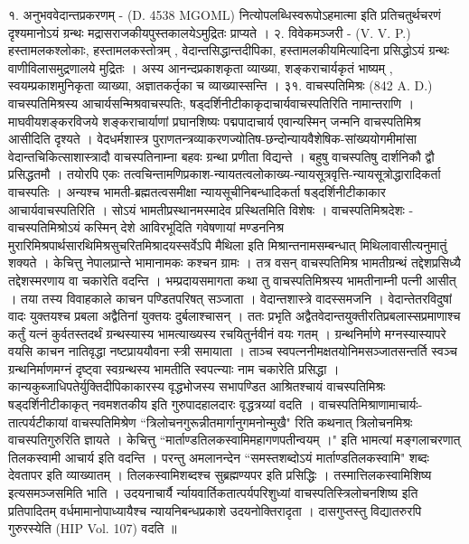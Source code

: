 १. अनुभववेदान्तप्रकरणम् - (D. 4538 MGOML)
नित्योपलब्धिस्वरूपोऽहमात्मा इति प्रतिचतुर्थचरणं दृश्यमानोऽयं ग्रन्थः मद्रासराजकीयपुस्तकालयेऽमुद्रितः प्राप्यते ।
२. विवेकमञ्जरी - (V. V. P.)
हस्तामलकश्लोकाः, हस्तामलकस्तोत्रम् , वेदान्तसिद्धान्तदीपिका, हस्तामलकीयमित्यादिना प्रसिद्धोऽयं ग्रन्थः वाणीविलासमुद्रणालये मुद्रितः । अस्य आनन्दप्रकाशकृता व्याख्या, शङ्कराचार्यकृतं भाष्यम् , स्वयम्प्रकाशमुनिकृता व्याख्या, अज्ञातकर्तृका च व्याख्यास्सन्ति ।
३१. वाचस्पतिमिश्रः (842 A. D.)
वाचस्पतिमिश्रस्य आचार्यसन्मिश्रवाचस्पतिः, षड्दर्शिनीटीकाकृदाचार्यवाचस्पतिरिति नामान्तराणि । माघवीयशङ्करविजये शङ्कराचार्याणां प्रघानशिष्यः पद्मपादाचार्य एवान्यस्मिन् जन्मनि वाचस्पतिमिश्र आसीदिति दृश्यते । वेदधर्मशास्त्र पुराणतन्त्रव्याकरणज्योतिष-छन्दोन्यायवैशेषिक-सांख्ययोगमीमांसा वेदान्तचिकित्साशास्त्रादौ वाचस्पतिनाम्ना बहवः ग्रन्था प्रणीता विद्यन्ते । बहुषु वाचस्पतिषु दार्शनिकौ द्वौ प्रसिद्धतमौ । तयोरपि एकः तत्वचिन्तामणिप्रकाश-न्यायतत्वलोकाख्य-न्यायसूत्रवृत्ति-न्यायसूत्रोद्धारादिकर्ता वाचस्पतिः । अन्यश्च भामती-ब्रह्मतत्वसमीक्षा न्यायसूचीनिबन्धादिकर्ता षड्दर्शिनीटीकाकार आचार्यवाचस्पतिरिति । सोऽयं भामतीप्रस्थानमस्मादेव प्रस्थितमिति विशेषः ।
वाचस्पतिमिश्रदेशः -
वाचस्पतिमिश्रोऽयं कस्मिन् देशे आविरभूदिति गवेषणायां मण्डननिश्र मुरारिमिश्रपार्थसारथिमिश्रसुचरितमिश्रादयस्सर्वेऽपि मैथिला इति मिश्रान्तनामसम्बन्धात् मिथिलावासीत्यनुमातुं शक्यते । केचित्तु नेपालप्रान्ते भामानामकः कश्चन ग्रामः । तत्र वसन् वाचस्पतिमिश्र भामतीग्रन्थं तद्देशप्रसिध्यै तद्देशस्मरणाय वा चकारेति वदन्ति ।
भम्प्रदायसमागता कथा तु वाचस्पतिमिश्रस्य भामतीनाम्नी पत्नी आसीत् । तया तस्य विवाहकाले काचन पण्डितपरिषत् सञ्जाता । वेदान्तशास्त्रे वादस्समजनि । वेदान्तेतरविदुषां वादः युक्तयश्च प्रबला अद्वैतिनां युक्तयः दुर्बलाश्चासन् । ततः प्रभृति अद्वैतवेदान्तयुक्तीरतिप्रबलास्सप्रमाणाश्च कर्तुं यत्नं कुर्वतस्तदर्थं ग्रन्थस्यास्य भामत्याख्यस्य रचयितुर्नवीनं वयः गतम् । ग्रन्थनिर्माणे मग्नस्यास्यापरे वयसि काचन नातिवृद्धा नष्टप्राययौवना स्त्री समायाता । ताञ्च स्वपत्ननीमक्षतयोनिमसञ्जातसन्तर्ति स्वञ्च ग्रन्थनिर्माणमग्नं दृष्ट्वा स्वग्रन्थस्य भामतीति स्वपत्न्याः नाम चकारेति प्रसिद्धा ।
कान्यकुब्जाधिपतेर्युक्तिदीपिकाकारस्य वृद्धभोजस्य सभापण्डित आश्रितश्चायं वाचस्पतिमिश्रः षड्दर्शिनीटीकाकृत् नवमशतकीय इति गुरुपादहालदारः वृद्धत्रय्यां वदति ।
वाचस्पतिमिश्राणामाचार्यः-
तात्पर्यटीकायां वाचस्पतिमिश्रेण ``त्रिलोचनगुरून्नीतमार्गानुगमनोन्मुखै" रिति कथनात् त्रिलोचनमिश्रः वाचस्पतिगुरुरिति ज्ञायते । केचित्तु ``मार्ताण्डतिलकस्वामिमहागणपतीन्वयम् ।" इति भामत्यां मङ्गलाचरणात् तिलकस्वामी आचार्य इति वदन्ति । परन्तु अमलानन्देन ``समस्तशब्दोऽयं मार्ताण्डतिलकस्वामि" शब्दः देवतापर इति व्याख्यातम् । तिलकस्वामिशब्दश्च सुब्रह्मण्यपर इति प्रसिद्धिः । तस्मात्तिलकस्वामिशिष्य इत्यसमञ्जसमिति भाति । उदयनाचार्यै र्न्यायवार्तिकतात्पर्यपरिशुध्यां वाचस्पतिस्त्रिलोचनशिष्य इति प्रतिपादितम् वर्धमामानोपाध्यायैश्च न्यायनिबन्धप्रकाशे उदयनोक्तिरादृता । दासगुप्तस्तु विद्यातरुरपि गुरुरस्येति (HIP Vol. 107) वदति ॥
